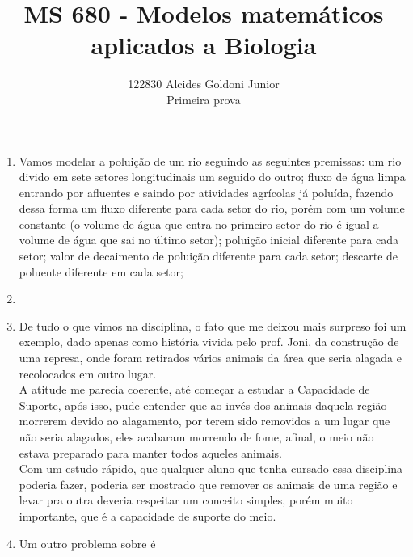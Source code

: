 \documentclass[a4paper]{article}
\title{MS 680 - Modelos matem\'{a}ticos aplicados a Biologia}
\author{122830 Alcides Goldoni Junior\\
  \Small Primeira prova \\
}%
\begin{document}
\maketitle
\begin{enumerate}
\item
Vamos modelar a polui\c{c}\~ao de um rio seguindo as seguintes premissas: um rio divido em sete setores longitudinais um seguido do outro; fluxo de \'agua limpa entrando por afluentes e saindo por atividades agr\'icolas j\'a polu\'ida, fazendo dessa forma um fluxo diferente para cada setor do rio, por\'em com um volume constante (o volume de \'agua que entra no primeiro setor do rio \'e igual a volume de \'agua que sai no \'ultimo setor); polui\c{c}\~ao inicial diferente para cada setor; valor de decaimento de polui\c{c}\~ao diferente para cada setor; descarte de poluente diferente em cada setor;
\\
\item
\\
\item
De tudo o que vimos na disciplina, o fato que me deixou mais surpreso foi um exemplo, dado apenas como hist\'oria vivida pelo prof. Joni, da constru\c{c}\~ao de uma represa, onde foram retirados v\'arios animais da \'area que seria alagada e recolocados em outro lugar.
\\
A atitude me parecia coerente, at\'e come\c{c}ar a estudar a Capacidade de Suporte, ap\'os isso, pude entender que ao inv\'es dos animais daquela regi\~ao morrerem devido ao alagamento, por terem sido removidos a um lugar que n\~ao seria alagados, eles acabaram morrendo de fome, afinal, o meio n\~ao estava preparado para manter todos aqueles animais.
\\
Com um estudo r\'apido, que qualquer aluno que tenha cursado essa disciplina poderia fazer, poderia ser mostrado que remover os animais de uma regi\~ao e levar pra outra deveria respeitar um conceito simples, por\'em muito importante, que \'e a capacidade de suporte do meio. 
\\
\item
Um outro problema sobre \'e
\\

\end{enumerate}
\end{document}
